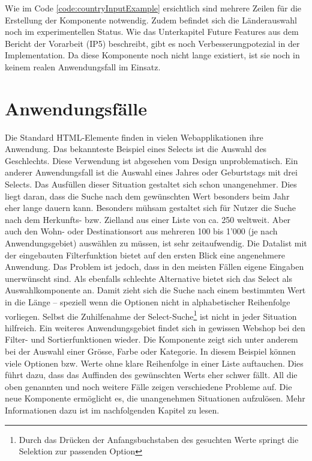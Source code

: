 Wie im Code \ref{code:countryInputExample} ersichtlich sind mehrere Zeilen für die Erstellung der Komponente notwendig.
Zudem befindet sich die Länderauswahl noch im experimentellen Status.
Wie das Unterkapitel Future Features aus dem Bericht\citemarktext{
    [\cite{ip5}]
} der Vorarbeit (IP5) beschreibt, gibt es noch Verbesserungpotezial in der Implementation.
Da diese Komponente noch nicht lange existiert, ist sie noch in keinem realen Anwendungsfall im Einsatz.


\section{Anwendungsfälle}
\label{sec:useCases}

Die Standard HTML-Elemente finden in vielen Webapplikationen ihre Anwendung.
Das bekannteste Beispiel eines Selects ist die Auswahl des Geschlechts.
Diese Verwendung ist abgesehen vom Design unproblematisch.
Ein anderer Anwendungsfall ist die Auswahl eines Jahres oder Geburtstags mit drei Selects.
Das Ausfüllen dieser Situation gestaltet sich schon unangenehmer.
Dies liegt daran, dass die Suche nach dem gewünschten Wert besonders beim Jahr eher lange dauern kann.
Besonders mühsam gestaltet sich für Nutzer die Suche nach dem Herkunfts- bzw. Zielland aus einer Liste von ca. 250 weltweit.
Aber auch den Wohn- oder Destinationsort aus mehreren 100 bis 1'000 (je nach Anwendungsgebiet) auswählen zu müssen, ist sehr zeitaufwendig.
Die Datalist mit der eingebauten Filterfunktion bietet auf den ersten Blick eine angenehmere Anwendung.
Das Problem ist jedoch, dass in den meisten Fällen eigene Eingaben unerwünscht sind.
Als ebenfalls schlechte Alternative bietet sich das Select als Auswahlkomponente an.
Damit zieht sich die Suche nach einem bestimmten Wert in die Länge – speziell wenn die Optionen nicht in alphabetischer Reihenfolge vorliegen.
Selbst die Zuhilfenahme der Select-Suche\footnote{
    Durch das Drücken der Anfangsbuchstaben des gesuchten Werte springt die Selektion zur passenden Option
} ist nicht in jeder Situation hilfreich. 
Ein weiteres Anwendungsgebiet findet sich in gewissen Webshop bei den Filter- und Sortierfunktionen wieder.
Die Komponente zeigt sich unter anderem bei der Auswahl einer Grösse, Farbe oder Kategorie.
In diesem Beispiel können viele Optionen bzw. Werte ohne klare Reihenfolge in einer Liste auftauchen.
Dies führt dazu, dass das Auffinden des gewünschten Werts eher schwer fällt.
All die oben genannten und noch weitere Fälle zeigen verschiedene Probleme auf.
Die neue Komponente ermöglicht es, die unangenehmen Situationen aufzulösen.
Mehr Informationen dazu ist im nachfolgenden Kapitel zu lesen.
